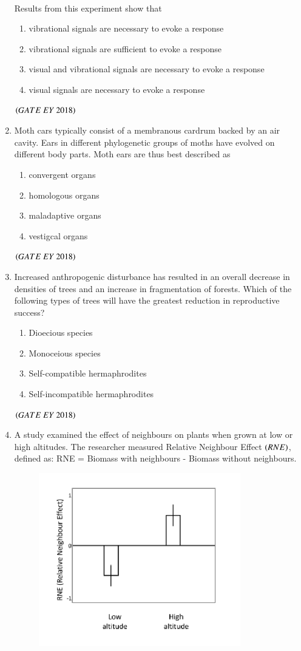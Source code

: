 \documentclass[journal]{IEEEtran}
\numberwithin{equation}{enumi}
\numberwithin{figure}{enumi}
\begin{document}
\begin{enumerate}
   \\
   Results from this experiment show that 
    \begin{enumerate}
        \item vibrational signals are necessary to evoke a response
        \item vibrational signals are sufficient to evoke a response
        \item visual and vibrational signals are necessary to evoke a response
        \item visual signals are necessary to evoke a response
    \end{enumerate}
    \hfill{$\brak{ GATE\ EY\ 2018}$}
    \bigskip
    \item Moth cars typically consist of a membranous cardrum backed by an air cavity. Ears
in different phylogenetic groups of moths have evolved on different body parts.
Moth ears are thus best described as
    \begin{enumerate}
        \item convergent organs
        \item homologous organs
        \item maladaptive organs
        \item vestigcal organs
    \end{enumerate}
    \hfill{$\brak{ GATE\ EY\ 2018}$}
    \bigskip
    \item Increased anthropogenic disturbance has resulted in an overall decrease in densities
of trees and an increase in fragmentation of forests. Which of the following types of
trees will have the greatest reduction in reproductive success?
    \begin{enumerate}
        \item Dioecious species
        \item Monoceious species
        \item Self-compatible hermaphrodites
        \item Self-incompatible hermaphrodites
    \end{enumerate}
    \hfill{$\brak{ GATE\ EY\ 2018}$}
    \bigskip
    \item A study examined the effect of neighbours on plants when grown at low or high
altitudes. The researcher measured Relative Neighbour Effect $\left(RNE\right)$, defined as:
RNE = Biomass with neighbours - Biomass without neighbours.
\begin{figure}[!ht]
    \centering
    \includegraphics[width=0.5\columnwidth]{figs/3.png}

\end{figure}
\end{enumerate}
\end{document}
